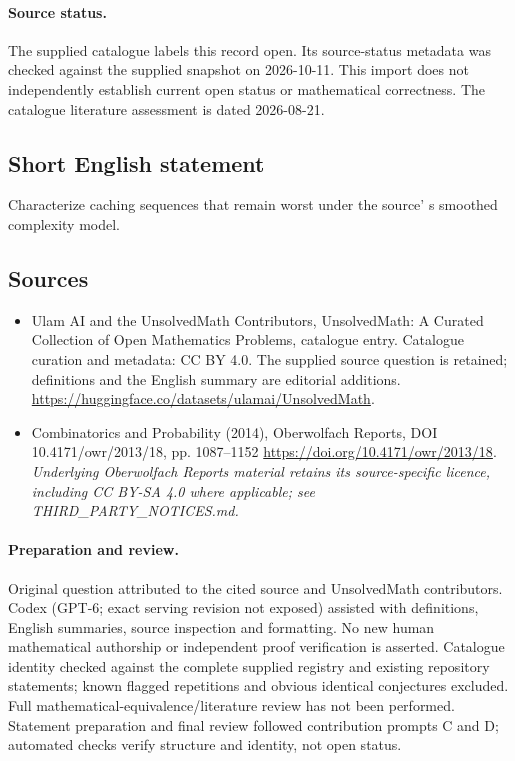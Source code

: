\documentclass[11pt]{article}
\begin{document}
\paragraph{Source status.}
The supplied catalogue labels this record open. Its source-status metadata was checked against the supplied snapshot on 2026-10-11. This import does not independently establish current open status or mathematical correctness. The catalogue literature assessment is dated 2026-08-21.
\subsection{Short English statement}
Characterize caching sequences that remain worst under the source' s smoothed complexity model.
\subsection{Sources}
\begin{itemize}
\item[S1] Ulam AI and the UnsolvedMath Contributors, UnsolvedMath: A Curated Collection of Open Mathematics Problems, catalogue entry. Catalogue curation and metadata: CC BY 4.0. The supplied source question is retained; definitions and the English summary are editorial additions.
\url{https://huggingface.co/datasets/ulamai/UnsolvedMath}.
\item[S2] Combinatorics and Probability (2014), Oberwolfach Reports, DOI 10.4171/owr/2013/18, pp. 1087--1152
\url{https://doi.org/10.4171/owr/2013/18}.
\textit{Underlying Oberwolfach Reports material retains its source-specific licence, including CC BY-SA 4.0 where applicable; see THIRD\_PARTY\_NOTICES.md.}
\end{itemize}
\paragraph{Preparation and review.}
Original question attributed to the cited source and UnsolvedMath contributors. Codex (GPT-6; exact serving revision not exposed) assisted with definitions, English summaries, source inspection and formatting. No new human mathematical authorship or independent proof verification is asserted. Catalogue identity checked against the complete supplied registry and existing repository statements; known flagged repetitions and obvious identical conjectures excluded. Full mathematical-equivalence/literature review has not been performed. Statement preparation and final review followed contribution prompts C and D; automated checks verify structure and identity, not open status.
\label{end:statement}
\end{document}
